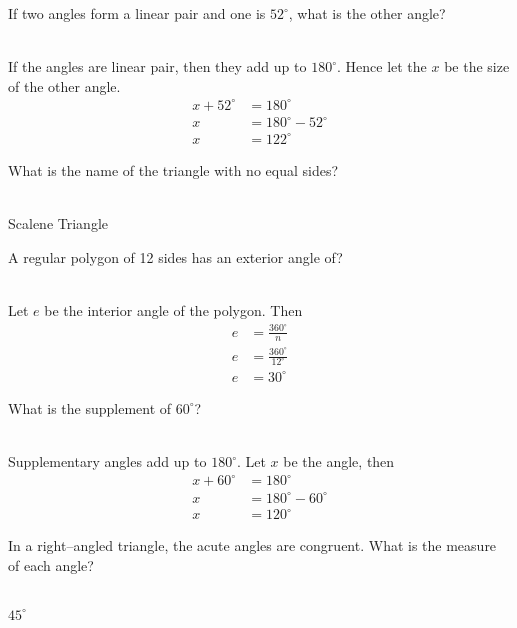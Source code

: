 \documentclass[addpoints,12pt]{exam}
\begin{document}
\begin{questions}
 \question If two angles form a linear pair and one is $52^\circ$, what is the other angle?
	\ifprintanswers
	  \begin{solution}\\
		If the angles are linear pair, then they add up to $180^\circ$. Hence let the $x$ be the 
size of the other angle. 
		\begin{align}
		 x + 52^\circ &= 180^\circ \\
		 x &= 180^\circ - 52^\circ \\
		 x &= 122^\circ
		\end{align}

	  \end{solution}
	\else
	  \makeemptybox{1.33in}
	\fi
	
 \question What is the name of the triangle with no equal sides?
	\ifprintanswers
	  \begin{solution}\\
		Scalene Triangle
	  \end{solution}
	\else
	  \makeemptybox{1.33in}
	\fi
	
 \question A regular polygon of 12 sides has an exterior angle of?
	\ifprintanswers
	  \begin{solution}\\
		Let $e$ be the interior angle of the polygon. Then
		\begin{align}		  
		  e &= \frac{360^\circ}{n} \\
		  e &= \frac{360^\circ}{12^\circ} \\
		  e &= 30^\circ
		\end{align}

	  \end{solution}
	\else
	  \makeemptybox{1.33in}
	\fi
	
 \question What is the supplement of $60^\circ$?
	\ifprintanswers
	  \begin{solution}\\
		Supplementary angles add up to $180^\circ$. Let $x$ be the angle, then
		\begin{align}
		  x + 60^\circ &= 180^\circ \\
		  x &= 180^\circ-60^\circ \\
		  x &= 120^\circ
		\end{align}

	  \end{solution}
	\else
	  \makeemptybox{1.33in}
	\fi
	
 \question In a right--angled triangle, the acute angles are congruent. What is the measure of 
each angle?
	\ifprintanswers
	  \begin{solution}\\
		$45^\circ$
	  \end{solution}
	\else
	  \makeemptybox{1.33in}
	\fi
	

\end{questions}
\end{document}
